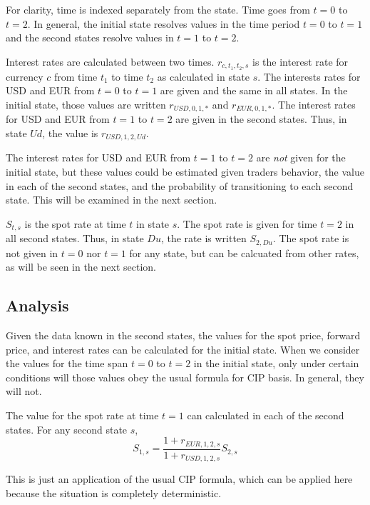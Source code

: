 For clarity, time is indexed separately from the state.  Time goes from $t=0$ to $t=2$.  In general, the initial state resolves values in the time period $t=0$ to $t=1$ and the second states resolve values in $t=1$ to $t=2$. 

Interest rates are calculated between two times.  $r_{c,t_1,t_2,s}$ is the interest rate for currency $c$ from time $t_1$ to time $t_2$ as calculated in state $s$.  The interests rates for USD and EUR from $t=0$ to $t=1$ are given and the same in all states.  In the initial state, those values are written $r_{USD,0,1,*}$ and $r_{EUR,0,1,*}$.  The interest rates for USD and EUR from $t=1$ to $t=2$ are given in the second states.  Thus, in state $Ud$, the value is $r_{USD,1,2,Ud}$.  

The interest rates for USD and EUR from $t=1$ to $t=2$ are \emph{not} given for the initial state, but these values could be estimated given traders behavior, the value in each of the second states, and the probability of transitioning to each second state.  This will be examined in the next section.

$S_{t,s}$ is the spot rate at time $t$ in state $s$.  The spot rate is given for time $t=2$ in all second states.  Thus, in state $Du$, the rate is written $S_{2,Du}$.  The spot rate is not given in $t=0$ nor $t=1$ for any state, but can be calcuated from other rates, as will be seen in the next section.


\subsection{Analysis}

Given the data known in the second states, the values for the spot price, forward price, and interest rates can be calculated for the initial state.  When we consider the values for the time span $t=0$ to $t=2$ in the initial state, only under certain conditions will those values obey the usual formula for CIP basis.  In general, they will not.

The value for the spot rate at time $t=1$ can calculated in each of the second states.  For any second state $s$, 
\begin{equation}
  S_{1,s} = \frac{1+r_{EUR,1,2,s}}{1 + r_{USD,1,2,s}} S_{2,s}
\end{equation}

\noindent This is just an application of the usual CIP formula, which can be applied here because the situation is completely deterministic.  

